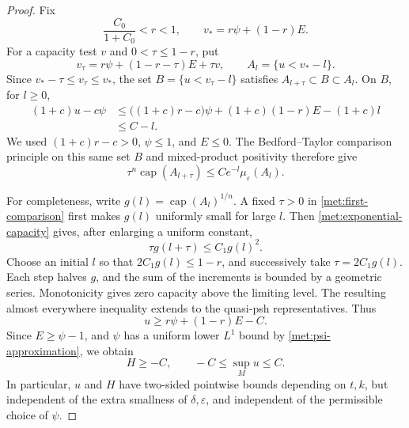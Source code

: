 \documentclass[11pt,letterpaper]{article}
\theoremstyle{definition}
\theoremstyle{remark}
\begin{document}
\begin{proof}
Fix
\[
 \frac{C_0}{1+C_0}<r<1,
 \qquad v_*=r\psi+(1-r)E.
\]
For a capacity test \(v\) and \(0<\tau\leq1-r\), put
\[
 v_\tau=r\psi+(1-r-\tau)E+\tau v,
 \qquad A_l=\{u<v_*-l\}.
\]
Since \(v_*-\tau\leq v_\tau\leq v_*\), the set
\(B=\{u<v_\tau-l\}\) satisfies
\(A_{l+\tau}\subset B\subset A_l\).  On \(B\), for \(l\geq0\),
\begin{align*}
 (1+c)u-c\psi
 &\leq\bigl((1+c)r-c\bigr)\psi
       +(1+c)(1-r)E-(1+c)l\\
 &\leq C-l.
\end{align*}
We used \((1+c)r-c>0\), \(\psi\leq1\), and \(E\leq0\).
The Bedford--Taylor comparison principle on this same set \(B\)
and mixed-product positivity therefore give
\begin{equation}
 \label{met:first-comparison}
 \tau^n\operatorname{cap}(A_{l+\tau})
 \leq C e^{-l}\mu_\varepsilon(A_l).
\end{equation}

For completeness, write \(g(l)=\operatorname{cap}(A_l)^{1/n}\).
A fixed \(\tau>0\) in \eqref{met:first-comparison} first makes
\(g(l)\) uniformly small for large \(l\).  Then
\eqref{met:exponential-capacity} gives, after enlarging a uniform
constant,
\[
 \tau g(l+\tau)\leq C_1 g(l)^2.
\]
Choose an initial \(l\) so that \(2C_1g(l)\leq1-r\), and successively
take \(\tau=2C_1g(l)\).  Each step halves \(g\), and the sum of the
increments is bounded by a geometric series.  Monotonicity gives
zero capacity above the limiting level.  The resulting almost
everywhere inequality extends to the quasi-psh representatives.
Thus
\begin{equation}
 \label{met:first-lower-bound}
 u\geq r\psi+(1-r)E-C.
\end{equation}
Since \(E\geq\psi-1\), and \(\psi\) has a uniform lower \(L^1\)
bound by \eqref{met:psi-approximation}, we obtain
\begin{equation}
 \label{met:H-normalization}
 H\geq-C,
 \qquad -C\leq\sup_M u\leq C.
\end{equation}
In particular, \(u\) and \(H\) have two-sided pointwise bounds
depending on \(t,k\), but independent of the extra smallness of
\(\delta,\varepsilon\), and independent of the permissible choice of
\(\psi\).


\end{proof}
\end{document}
